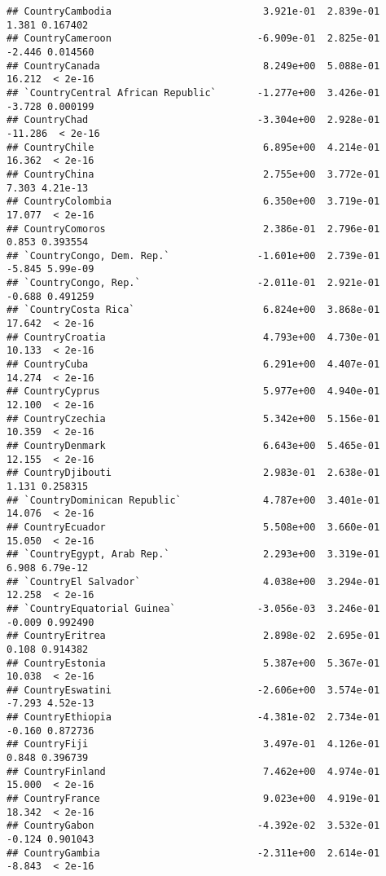 \documentclass[
]{article}
\begin{document}
\begin{verbatim}
## CountryCambodia                          3.921e-01  2.839e-01   1.381 0.167402
## CountryCameroon                         -6.909e-01  2.825e-01  -2.446 0.014560
## CountryCanada                            8.249e+00  5.088e-01  16.212  < 2e-16
## `CountryCentral African Republic`       -1.277e+00  3.426e-01  -3.728 0.000199
## CountryChad                             -3.304e+00  2.928e-01 -11.286  < 2e-16
## CountryChile                             6.895e+00  4.214e-01  16.362  < 2e-16
## CountryChina                             2.755e+00  3.772e-01   7.303 4.21e-13
## CountryColombia                          6.350e+00  3.719e-01  17.077  < 2e-16
## CountryComoros                           2.386e-01  2.796e-01   0.853 0.393554
## `CountryCongo, Dem. Rep.`               -1.601e+00  2.739e-01  -5.845 5.99e-09
## `CountryCongo, Rep.`                    -2.011e-01  2.921e-01  -0.688 0.491259
## `CountryCosta Rica`                      6.824e+00  3.868e-01  17.642  < 2e-16
## CountryCroatia                           4.793e+00  4.730e-01  10.133  < 2e-16
## CountryCuba                              6.291e+00  4.407e-01  14.274  < 2e-16
## CountryCyprus                            5.977e+00  4.940e-01  12.100  < 2e-16
## CountryCzechia                           5.342e+00  5.156e-01  10.359  < 2e-16
## CountryDenmark                           6.643e+00  5.465e-01  12.155  < 2e-16
## CountryDjibouti                          2.983e-01  2.638e-01   1.131 0.258315
## `CountryDominican Republic`              4.787e+00  3.401e-01  14.076  < 2e-16
## CountryEcuador                           5.508e+00  3.660e-01  15.050  < 2e-16
## `CountryEgypt, Arab Rep.`                2.293e+00  3.319e-01   6.908 6.79e-12
## `CountryEl Salvador`                     4.038e+00  3.294e-01  12.258  < 2e-16
## `CountryEquatorial Guinea`              -3.056e-03  3.246e-01  -0.009 0.992490
## CountryEritrea                           2.898e-02  2.695e-01   0.108 0.914382
## CountryEstonia                           5.387e+00  5.367e-01  10.038  < 2e-16
## CountryEswatini                         -2.606e+00  3.574e-01  -7.293 4.52e-13
## CountryEthiopia                         -4.381e-02  2.734e-01  -0.160 0.872736
## CountryFiji                              3.497e-01  4.126e-01   0.848 0.396739
## CountryFinland                           7.462e+00  4.974e-01  15.000  < 2e-16
## CountryFrance                            9.023e+00  4.919e-01  18.342  < 2e-16
## CountryGabon                            -4.392e-02  3.532e-01  -0.124 0.901043
## CountryGambia                           -2.311e+00  2.614e-01  -8.843  < 2e-16

\end{verbatim}
\end{document}
